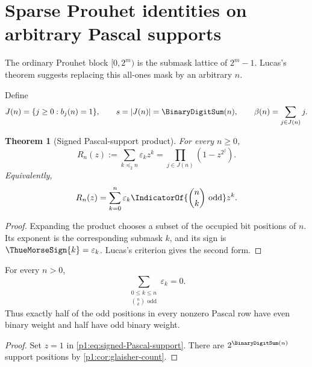 \documentclass[11pt,oneside]{article}
\numberwithin{equation}{section}
\newtheorem{theorem}{Theorem}[section]
\theoremstyle{definition}
\theoremstyle{remark}
\newcommand{\eps}{\varepsilon}
\newcommand{\submask}{\mathrel{\preccurlyeq_2}}
\begin{document}
\section[Sparse Prouhet identities]{Sparse Prouhet identities on arbitrary Pascal supports}
\label{p1:sec:sparse-prouhet}

The ordinary Prouhet block \([0,2^m)\) is the submask lattice of
\(2^m-1\).  Lucas's theorem suggests replacing this all-ones mask by an
arbitrary \(n\).

Define
\begin{equation}
  J(n)=\{j\ge0:b_j(n)=1\},
  \qquad
  s=|J(n)|=\BinaryDigitSum(n),
  \qquad
  \beta(n)=\sum_{j\in J(n)}j.
  \label{p1:eq:J-beta}
\end{equation}

\begin{theorem}[Signed Pascal-support product]
\label{p1:thm:signed-Pascal-support}
For every \(n\ge0\),
\begin{equation}
  \boxed{
  R_n(z):=\sum_{k\submask n}\eps_kz^k
  =\prod_{j\in J(n)}(1-z^{2^j}).}
  \label{p1:eq:signed-Pascal-support}
\end{equation}
Equivalently,
\begin{equation}
  R_n(z)=\sum_{k=0}^{n}
  \eps_k\IndicatorOf{\binom nk\text{ odd}}z^k.
  \label{p1:eq:signed-Pascal-Lucas}
\end{equation}
\end{theorem}

\begin{proof}
Expanding the product chooses a subset of the occupied bit positions of
\(n\).  Its exponent is the corresponding submask \(k\), and its sign is
\(\ThueMorseSign{k}=\eps_k\).  Lucas's criterion gives the second form.
\end{proof}

\begin{corollary}
\label{p1:cor:Pascal-support-balance}
For every \(n>0\),
\begin{equation}
  \sum_{\substack{0\le k\le n\\\binom nk\text{ odd}}}\eps_k=0.
  \label{p1:eq:Pascal-support-balance}
\end{equation}
Thus exactly half of the odd positions in every nonzero Pascal row have even
binary weight and half have odd binary weight.
\end{corollary}

\begin{proof}
Set \(z=1\) in \eqref{p1:eq:signed-Pascal-support}.  There are
\(2^{\BinaryDigitSum(n)}\) support positions by \cref{p1:cor:glaisher-count}.
\end{proof}
\end{document}
